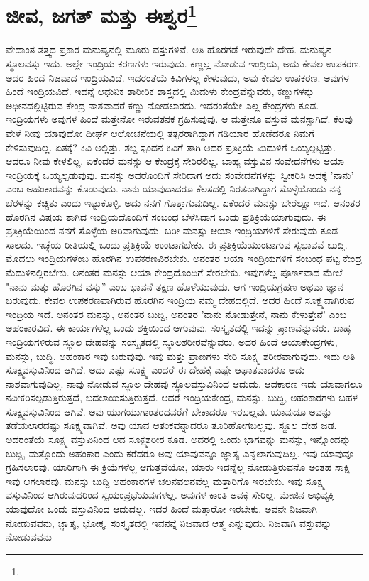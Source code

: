 
\chapter[ಜೀವ, ಜಗತ್ ಮತ್ತು ಈಶ್ವರ]{ಜೀವ, ಜಗತ್ ಮತ್ತು ಈಶ್ವರ\protect\footnote{}}

ವೇದಾಂತ ತತ್ತ್ವದ ಪ್ರಕಾರ ಮನುಷ್ಯನಲ್ಲಿ ಮೂರು ವಸ್ತುಗಳಿವೆ. ಅತಿ ಹೊರಗಡೆ ಇರುವುದೇ ದೇಹ. ಮನುಷ್ಯನ ಸ್ಥೂಲವಸ್ತು ಇದು. ಅಲ್ಲೇ ಇಂದ್ರಿಯ ಕರಣಗಳು ಇರುವುದು. ಕಣ್ಣಲ್ಲ ನೋಡುವ ಇಂದ್ರಿಯ, ಅದು ಕೇವಲ ಉಪಕರಣ. ಅದರ ಹಿಂದೆ ನಿಜವಾದ ಇಂದ್ರಿಯವಿದೆ. ಇದರಂತೆಯೆ ಕಿವಿಗಳಲ್ಲ ಕೇಳುವುದು, ಅವು ಕೇವಲ ಉಪಕರಣ. ಅವುಗಳ ಹಿಂದೆ ಇಂದ್ರಿಯವಿದೆ. ಇದನ್ನೆ ಆಧುನಿಕ ಶಾರೀರಿಕ ಶಾಸ್ತ್ರದಲ್ಲಿ ಮಿದುಳು ಕೇಂದ್ರವೆನ್ನುವರು, ಕಣ್ಣುಗಳನ್ನು ಅಧೀನದಲ್ಲಿಟ್ಟಿರುವ ಕೇಂದ್ರ ನಾಶವಾದರೆ ಕಣ್ಣು ನೋಡಲಾರದು. ಇದರಂತೆಯೇ ಎಲ್ಲ ಕೇಂದ್ರಗಳು ಕೂಡ. ಇಂದ್ರಿಯಗಳು ಅವುಗಳ ಹಿಂದೆ ಮತ್ತೇನೋ ಇರುವತನಕ ಗ್ರಹಿಸುವುವು. ಆ ಮತ್ತೇನೂ ವಸ್ತುವೆ ಮನಸ್ಸಾಗಿದೆ. ಕೆಲವು ವೇಳೆ ನೀವು ಯಾವುದೋ ದೀರ್ಘ ಆಲೋಚನೆಯಲ್ಲಿ ತತ್ಪರರಾಗಿದ್ದಾಗ ಗಡಿಯಾರ ಹೊಡೆದರೂ ನಿಮಗೆ ಕೇಳಿಸುವುದಿಲ್ಲ. ಏತಕ್ಕೆ? ಕಿವಿ ಅಲ್ಲಿತ್ತು. ಶಬ್ದ ಸ್ಪಂದನ ಕಿವಿಗೆ ತಾಗಿ ಅದರ ಪ್ರತಿಕ್ರಿಯೆ ಮಿದುಳಿಗೆ ಒಯ್ಯಲ್ಪಟ್ಟಿತ್ತು. ಆದರೂ ನೀವು ಕೇಳಲಿಲ್ಲ. ಏಕೆಂದರೆ ಮನಸ್ಸು ಆ ಕೇಂದ್ರಕ್ಕೆ ಸೇರಿರಲಿಲ್ಲ. ಬಾಹ್ಯ ವಸ್ತುವಿನ ಸಂವೇದನೆಗಳು ಆಯಾ ಇಂದ್ರಿಯಕ್ಕೆ ಒಯ್ಯಲ್ಪಡುವುವು. ಮನಸ್ಸು ಅದರೊಂದಿಗೆ ಸೇರಿದಾಗ ಅದು ಸಂವೇದನೆಗಳನ್ನು ಸ್ವೀಕರಿಸಿ ಅದಕ್ಕೆ 'ನಾನು' ಎಂಬ ಅಹಂಕಾರವನ್ನು ಕೊಡುವುದು. ನಾನು ಯಾವುದಾದರೂ ಕೆಲಸದಲ್ಲಿ ನಿರತನಾಗಿದ್ದಾಗ ಸೊಳ್ಳೆಯೊಂದು ನನ್ನ ಬೆರಳನ್ನು ಕಚ್ಚಿತು ಎಂದು ಇಟ್ಟುಕೊಳ್ಳಿ. ಅದು ನನಗೆ ಗೊತ್ತಾಗುವುದಿಲ್ಲ. ಏಕೆಂದರೆ ಮನಸ್ಸು ಬೇರೆಲ್ಲೂ ಇದೆ. ಆನಂತರ ಹೊರಗಿನ ವಿಷಯ ತಾಗಿದ ಇಂದ್ರಿಯದೊಂದಿಗೆ ಸಂಬಂಧ ಬೆಳೆಸಿದಾಗ ಒಂದು ಪ್ರತಿಕ್ರಿಯೆಯಾಗುವುದು. ಈ ಪ್ರತಿಕ್ರಿಯೆಯಿಂದ ನನಗೆ ಸೊಳ್ಳೆಯ ಅರಿವಾಗುವುದು. ಬರೀ ಮನಸ್ಸು ಆಯಾ ಇಂದ್ರಿಯಗಳಿಗೆ ಸೇರುವುದು ಕೂಡ ಸಾಲದು. ಇಚ್ಛೆಯ ರೀತಿಯಲ್ಲಿ ಒಂದು ಪ್ರತಿಕ್ರಿಯೆ ಉಂಟಾಗಬೇಕು. ಈ ಪ್ರತಿಕ್ರಿಯೆಯುಂಟಾಗುವ ಸ್ವಭಾವವೆ ಬುದ್ದಿ. ಮೊದಲು ಇಂದ್ರಿಯಗಳೆಂಬ ಹೊರಗಿನ ಉಪಕರಣವಿರಬೇಕು. ಅನಂತರ ಆಯಾ ಇಂದ್ರಿಯಗಳಿಗೆ ಸಂಬಂಧ ಪಟ್ಟ ಕೇಂದ್ರ ಮೆದುಳಿನಲ್ಲಿರಬೇಕು. ಅನಂತರ ಮನಸ್ಸು ಆಯಾ ಕೇಂದ್ರದೊಂದಿಗೆ ಸೇರಬೇಕು. ಇವುಗಳೆಲ್ಲ ಪೂರ್ಣವಾದ ಮೇಲೆ "ನಾನು ಮತ್ತು ಹೊರಗಿನ ವಸ್ತು” ಎಂಬ ಭಾವನೆ ತಕ್ಷಣ ಹೊಳೆಯುವುದು. ಆಗ ಇಂದ್ರಿಯಗ್ರಹಣ ಅಥವಾ ಜ್ಞಾನ ಬರುವುದು. ಕೇವಲ ಉಪಕರಣವಾಗಿರುವ ಹೊರಗಿನ ಇಂದ್ರಿಯ ನಮ್ಮ ದೇಹದಲ್ಲಿದೆ. ಅದರ ಹಿಂದೆ ಸೂಕ್ಷ್ಮವಾಗಿರುವ ಇಂದ್ರಿಯ ಇದೆ. ಅನಂತರ ಮನಸ್ಸು, ಅನಂತರ ಬುದ್ದಿ, ಅನಂತರ 'ನಾನು ನೋಡುತ್ತೇನೆ, ನಾನು ಕೇಳುತ್ತೇನೆ' ಎಂಬ ಅಹಂಕಾರವಿದೆ. ಈ ಕಾರ್ಯಗಳೆಲ್ಲ ಒಂದು ಶಕ್ತಿಯಿಂದ ಆಗುವುವು. ಸಂಸ್ಕೃತದಲ್ಲಿ ಇದನ್ನು ಪ್ರಾಣವೆನ್ನುವರು. ಬಾಹ್ಯ ಇಂದ್ರಿಯಗಳಿರುವ ಸ್ಥೂಲ ದೇಹವನ್ನು ಸಂಸ್ಕೃತದಲ್ಲಿ ಸ್ಥೂಲಶರೀರವೆನ್ನುವರು. ಅದರ ಹಿಂದೆ ಆಯಾ\break ಕೇಂದ್ರಗಳು, ಮನಸ್ಸು, ಬುದ್ಧಿ, ಅಹಂಕಾರ ಇವು ಬರುವುವು. ಇವು ಮತ್ತು ಪ್ರಾಣಗಳು ಸೇರಿ ಸೂಕ್ಷ್ಮ ಶರೀರವಾಗುವುದು. ಇದು ಅತಿ ಸೂಕ್ಷ್ಮವಸ್ತುವಿನಿಂದ ಆಗಿದೆ. ಅದು ಎಷ್ಟು ಸೂಕ್ಷ್ಮ ಎಂದರೆ ಈ ದೇಹಕ್ಕೆ ಎಷ್ಟೇ ಆಘಾತವಾದರೂ ಅದು ನಾಶವಾಗುವುದಿಲ್ಲ. ನಾವು ನೋಡುವ ಸ್ಥೂಲ ದೇಹವು ಸ್ಥೂಲವಸ್ತುವಿನಿಂದ ಆದುದು. ಆದಕಾರಣ ಇದು ಯಾವಾಗಲೂ ನವೀಕರಿಸಲ್ಪಡುತ್ತಿರುತ್ತದೆ, ಬದಲಾಯಿಸುತ್ತಿರುತ್ತದೆ. ಆದರೆ ಇಂದ್ರಿಯಕೇಂದ್ರ, ಮನಸ್ಸು, ಬುದ್ಧಿ, ಅಹಂಕಾರಗಳು ಬಹಳ ಸೂಕ್ಷ್ಮವಸ್ತುವಿನಿಂದ ಆಗಿವೆ. ಅವು ಯುಗಯುಗಾಂತರದವರೆಗೆ ಬೇಕಾದರೂ ಇರಬಲ್ಲವು. ಯಾವುದೂ ಅವನ್ನು ತಡೆಯಲಾರದಷ್ಟು ಸೂಕ್ಷ್ಮವಾಗಿವೆ. ಅವು ಯಾವ ಆತಂಕವನ್ನಾದರೂ ತೂರಿಹೋಗಬಲ್ಲವು. ಸ್ಥೂಲ ದೇಹ ಜಡ. ಅದರಂತೆಯೆ ಸೂಕ್ಷ್ಮ ವಸ್ತುವಿನಿಂದ ಆದ ಸೂಕ್ಷ್ಮಶರೀರ ಕೂಡ. ಅದರಲ್ಲಿ ಒಂದು ಭಾಗವನ್ನು ಮನಸ್ಸು, ಇನ್ನೊಂದನ್ನು ಬುದ್ದಿ, ಮತ್ತೊಂದು ಅಹಂಕಾರ ಎಂದು ಕರೆದರೂ ಅವು ಯಾವುವನ್ನೂ ಜ್ಞಾತೃ ಎನ್ನಲಾಗುವುದಿಲ್ಲ. ಇವು ಯಾವುವೂ ಗ್ರಹಿಸಲಾರವು. ಯಾರಿಗಾಗಿ ಈ ಕ್ರಿಯೆಗಳೆಲ್ಲ ಆಗುತ್ತವೆಯೋ, ಯಾರು ಇದನ್ನೆಲ್ಲ ನೋಡುತ್ತಿರುವನೊ ಅಂತಹ ಸಾಕ್ಷಿ ಇವು ಆಗಲಾರವು. ಮನಸ್ಸು ಬುದ್ದಿ ಅಹಂಕಾರಗಳ ಚಲನವಲನವೆಲ್ಲ ಮತ್ತಾರಿಗೊ ಇರಬೇಕು. ಇವು ಸೂಕ್ಷ್ಮ ವಸ್ತುವಿನಿಂದ ಆಗಿರುವುದರಿಂದ ಸ್ವಯಂಪ್ರಭೆಯವುಗಳಲ್ಲ. ಅವುಗಳ ಕಾಂತಿ ಅವಕ್ಕೆ ಸೇರಿಲ್ಲ. ಮೇಜಿನ ಅಭಿವ್ಯಕ್ತಿ ಯಾವುದೋ ಒಂದು ವಸ್ತುವಿನಿಂದ ಆದುದಲ್ಲ. ಇದರ ಹಿಂದೆ ಮತ್ತಾರೋ ಇರಬೇಕು. ಅವನೇ ನಿಜವಾಗಿ ನೋಡುವವನು, ಜ್ಞಾತೃ, ಭೋಕ್ತೃ, ಸಂಸ್ಕೃತದಲ್ಲಿ ಇವನನ್ನೆ ನಿಜವಾದ ಆತ್ಮ ಎನ್ನುವುದು. ನಿಜವಾಗಿ ವಸ್ತುವನ್ನು ನೋಡುವವನು 